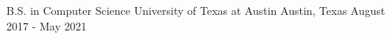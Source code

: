 

\begin{cventries}

  \cventry
    {B.S. in Computer Science} %
    {University of Texas at Austin} %
    {Austin, Texas} %
    {August 2017 - May 2021} %
\end{cventries}

